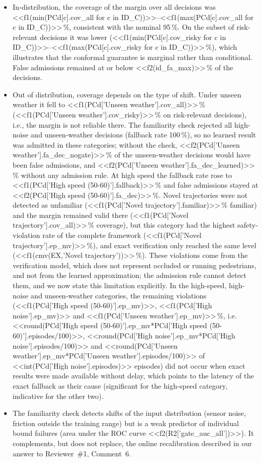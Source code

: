 \documentclass[11pt]{article}
\begin{document}
\begin{itemize}[leftmargin=1.3em,itemsep=1pt]
\item In-distribution, the coverage of the margin over all decisions was <<f1(min(PCd[c].cov_all for c in ID_C))>>--<<f1(max(PCd[c].cov_all for c in ID_C))>>\,\%,
consistent with the nominal 95\,\%. On the subset of risk-relevant decisions it was lower
(<<f1(min(PCd[c].cov_risky for c in ID_C))>>--<<f1(max(PCd[c].cov_risky for c in ID_C))>>\,\%), which illustrates that the conformal guarantee is
marginal rather than conditional. False admissions remained at or below <<f2(id_fa_max)>>\,\% of the decisions.
\item Out of distribution, coverage depends on the type of shift. Under unseen weather it fell to <<f1(PCd['Unseen weather'].cov_all)>>\,\%
(<<f1(PCd['Unseen weather'].cov_risky)>>\,\% on risk-relevant decisions), i.e., the margin is not reliable there. The familiarity check
rejected all high-noise and unseen-weather decisions (fallback rate 100\,\%), so no learned result was admitted in these categories;
without the check, <<f2(PCd['Unseen weather'].fa_dec_nogate)>>\,\% of the unseen-weather decisions would have been false admissions, and
<<f2(PCd['Unseen weather'].fa_dec_learned)>>\,\% without any admission rule. At high speed the fallback rate rose to <<f1(PCd['High speed (50-60)'].fallback)>>\,\% and false admissions stayed at
<<f2(PCd['High speed (50-60)'].fa_dec)>>\,\%. Novel trajectories were not detected as unfamiliar
(<<f1(PCd['Novel trajectory'].familiar)>>\,\% familiar) and the margin remained valid there (<<f1(PCd['Novel trajectory'].cov_all)>>\,\% coverage),
but this category had the highest safety-violation rate of the complete framework (<<f1(PCd['Novel trajectory'].ep_mv)>>\,\%), and exact
verification only reached the same level (<<f1(cmv(EX,'Novel trajectory'))>>\,\%). These violations come from the verification model, which does
not represent occluded or running pedestrians, and not from the learned approximation; the admission rule cannot detect them, and we
now state this limitation explicitly. In the high-speed, high-noise and unseen-weather categories, the remaining violations
(<<f1(PCd['High speed (50-60)'].ep_mv)>>, <<f1(PCd['High noise'].ep_mv)>> and <<f1(PCd['Unseen weather'].ep_mv)>>\,\%, i.e. <<round(PCd['High speed (50-60)'].ep_mv*PCd['High speed (50-60)'].episodes/100)>>, <<round(PCd['High noise'].ep_mv*PCd['High noise'].episodes/100)>> and <<round(PCd['Unseen weather'].ep_mv*PCd['Unseen weather'].episodes/100)>> of <<int(PCd['High noise'].episodes)>> episodes) did not occur when exact
results were made available without delay, which points to the latency of the exact fallback as their cause (significant for the high-speed category,
indicative for the other two).
\item The familiarity check detects shifts of the input distribution (sensor noise, friction outside the training range) but is a
weak predictor of individual bound failures (area under the ROC curve <<f2(R2['gate_auc_all'])>>). It complements, but does not replace,
the online recalibration described in our answer to Reviewer~\#1, Comment~6.
\end{itemize}
\end{document}

